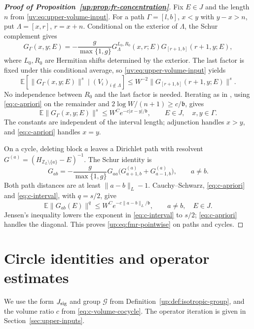 \documentclass[11pt]{article}
\numberwithin{equation}{section}
\theoremstyle{remark}
\newcommand{\E}{\mathbb E}
\newcommand{\Z}{\mathbb Z}
\begin{document}
\begin{proof}[\textbf{Proof of Proposition~\ref{up:prop:fr-concentration}}]
Fix $E\in J$ and the length $n$ from \eqref{uv:eq:upper-volume-input}.
For a path $\Gamma=[l,b]$, $x<y$ with $y-x>n$, put
$\Lambda=[x,r]$, $r=x+n$. Conditional on the exterior of $\Lambda$,
the Schur complement gives
\[
 G_\Gamma(x,y;E)=-\frac{g}{\max\{1,g\}}
 G_\Lambda^{L_0,R_0}(x,r;E)G_{[r+1,b]}(r+1,y;E),
\]
where $L_0,R_0$ are Hermitian shifts determined by the exterior.
The last factor is fixed under this conditional average, so
\eqref{uv:eq:upper-volume-input} yields
\[
 \E\!\left[\|G_\Gamma(x,y;E)\|^s\mid (V_i)_{i\notin\Lambda}\right]
 \le W^{-2}\|G_{[r+1,b]}(r+1,y;E)\|^s.
\]
No independence between $R_0$ and the last factor is needed.
Iterating as in \cite[proof of Theorem~1.1, (2.23)--(2.24)]{ASFH},
using \eqref{eq:c-apriori} on the remainder and
$2\log W/(n+1)\ge c/\mathfrak b$, gives
\begin{equation}\label{eq:c-interval}
 \E\|G_\Gamma(x,y;E)\|^s\le W^C e^{-c|x-y|/\mathfrak b},
 \qquad E\in J,\quad x,y\in\Gamma.
\end{equation}
The constants are independent of the interval length; adjunction
handles $x>y$, and \eqref{eq:c-apriori} handles $x=y$.

On a cycle, deleting block $a$ leaves a Dirichlet path with resolvent
$G^{(a)}=(H_{\Z_L\setminus\{a\}}-E)^{-1}$. The Schur identity is
\begin{equation}\label{eq:c-cycle-Schur}
 G_{ab}=-\frac{g}{\max\{1,g\}}G_{aa}
          \bigl(G^{(a)}_{a+1,b}+G^{(a)}_{a-1,b}\bigr),\qquad a\ne b.
\end{equation}
Both path distances are at least $\|a-b\|_L-1$. Cauchy--Schwarz,
\eqref{eq:c-apriori} and \eqref{eq:c-interval}, with $q=s/2$, give
\begin{equation}\label{eq:c-cycle}
 \E\|G_{ab}(E)\|^q\le W^C e^{-c\|a-b\|_L/\mathfrak b},
 \qquad a\ne b,\quad E\in J.
\end{equation}
Jensen's inequality lowers the exponent in \eqref{eq:c-interval}
to $s/2$; \eqref{eq:c-apriori} handles the diagonal. This proves
\eqref{up:eq:fmr-pointwise} on paths and cycles.
\end{proof}

\section{Circle identities and operator estimates}
\label{app:compact-circle}

We use the form $J_{\rm sig}$ and group $\mathcal G$ from
Definition~\ref{up:def:isotropic-group}, and the volume ratio $c$ from
\eqref{eq:c-volume-cocycle}.
The operator iteration is given in Section~\ref{sec:upper-inputs}.
\end{document}
